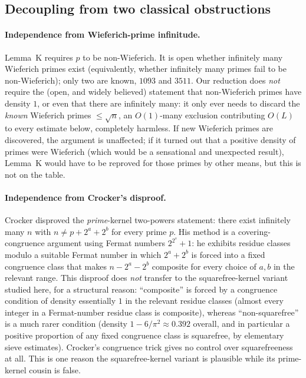 \documentclass[11pt]{article}
\theoremstyle{plain}
\theoremstyle{definition}
\theoremstyle{remark}
\begin{document}
\subsection{Decoupling from two classical obstructions}\label{sec:intro-decoupling}

\paragraph{Independence from Wieferich-prime infinitude.} Lemma~K requires
$p$ to be non-Wieferich. It is open whether infinitely many Wieferich primes
exist (equivalently, whether infinitely many primes fail to be
non-Wieferich); only two are known, $1093$ and $3511$. Our reduction does
\emph{not} require the (open, and widely believed) statement that
non-Wieferich primes have density $1$, or even that there are infinitely
many: it only ever needs to discard the \emph{known} Wieferich primes
$\le\sqrt n$, an $O(1)$-many exclusion contributing $O(L)$ to every estimate
below, completely harmless. If new Wieferich primes are discovered, the
argument is unaffected; if it turned out that a positive density of primes
were Wieferich (which would be a sensational and unexpected
result), Lemma~K would have to be reproved for those primes by other means,
but this is not on the table.

\paragraph{Independence from Crocker's disproof.} Crocker \cite{Crocker1971}
disproved the \emph{prime}-kernel two-powers statement: there exist
infinitely many $n$ with $n\ne p+2^a+2^b$ for every prime $p$. His method is a
covering-congruence argument using Fermat numbers $2^{2^s}+1$: he exhibits
residue classes modulo a suitable Fermat number in which $2^a+2^b$ is forced
into a fixed congruence class that makes $n-2^a-2^b$ composite for every
choice of $a,b$ in the relevant range. This disproof does \emph{not} transfer
to the squarefree-kernel variant studied here, for a structural reason:
``composite'' is forced by a congruence condition of density essentially $1$
in the relevant residue classes (almost every integer in a Fermat-number
residue class is composite), whereas ``non-squarefree'' is a much rarer
condition (density $1-6/\pi^2\approx0.392$ overall, and in particular a
positive proportion of any fixed congruence class is squarefree, by
elementary sieve estimates). Crocker's congruence trick gives no control over
squarefreeness at all. This is one reason the squarefree-kernel variant is
plausible while its prime-kernel cousin is false.
\end{document}
